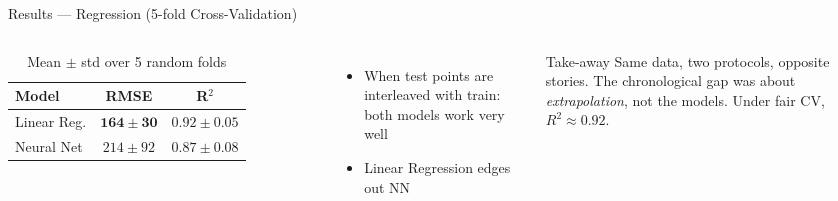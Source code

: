 \documentclass[aspectratio=169]{beamer}
\begin{document}
\begin{frame}{Results --- Regression (5-fold Cross-Validation)}
  \begin{columns}
      \begin{table}
        \centering
        \caption{Mean $\pm$ std over 5 random folds}
        \begin{tabular}{lcc}
          \toprule
          \textbf{Model} & \textbf{RMSE} & \textbf{R$^2$} \\
          \midrule
          Linear Reg. & $\mathbf{164 \pm 30}$ & $\mathbf{0.92 \pm 0.05}$ \\
          Neural Net  & $214 \pm 92$         & $0.87 \pm 0.08$ \\
          \bottomrule
        \end{tabular}
      \end{table}
      \vspace{0.5em}
      \begin{itemize}
        \item When test points are interleaved with train: both models work very well
        \item Linear Regression edges out NN
      \end{itemize}
      \begin{block}{Take-away}
        Same data, two protocols, opposite stories. The chronological gap was about \emph{extrapolation}, not the models. Under fair CV, $R^2 \approx 0.92$.
      \end{block}
  \end{columns}
\end{frame}
\end{document}
